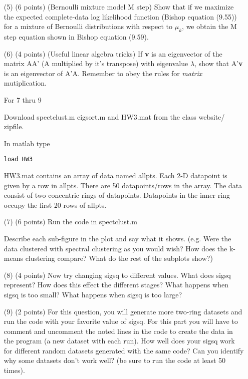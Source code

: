 \documentclass{article}
\begin{document}
\begin{itemize}
\item[(5) (6 points)] (Bernoulli mixture model M step)
Show that if we maximize the expected complete-data log likelihood function (Bishop equation (9.55)) for a mixture of Bernoulli distributions with respect to $\mu_k$, we obtain the M step equation shown in Bishop equation (9.59).

\item[(6) (4 points)] (Useful linear algebra tricks)
If {\bf v} is an eigenvector of the matrix AA' (A multiplied by it's 
transpose) with eigenvalue $\lambda$, show that A'{\bf v} is an
eigenvector of A'A.  Remember to obey the rules for {\it matrix} mutiplication.


\hspace{-1cm}
For 7 thru  9

Download spectclust.m  eigsort.m  and HW3.mat from the class website/ zipfile.

In matlab type 
\begin{verbatim}
load HW3
\end{verbatim} 

\hspace*{-1cm}\parbox{6.5in}{ HW3.mat contains an array of data named allpts.  Each 2-D datapoint
is given by a row in allpts.  There are 50 datapoints/rows in the array.  The data consist of two concentric rings of datapoints.  Datapoints in the inner ring occupy the first 20 rows of allpts.}

\item[(7)] (6  points)   Run the code in spectclust.m    

Describe each sub-figure in the plot and say what it shows.    
(e.g. Were the data clustered with spectral clustering as you would wish?   How does the k-means clustering compare?  What do the rest of the subplots show?)

 
\item[(8)] (4 points) Now try changing sigsq to different values.  What does sigsq represent?
How does this effect the different stages?   What happens when sigsq is too small?  What happens when sigsq is too large?


\item[(9)] (2 points) For this question, you will generate more two-ring datasets and run the code
with your favorite value of sigsq.   For this part you will have to comment and uncomment the noted lines in the code to create the data in the program (a new dataset with each run).   How well does your sigsq work for different random datasets generated  with the same code?  Can you identify why some datasets don't work well? (be sure to run the code at least 50 times).



\end{itemize}
\end{document}
